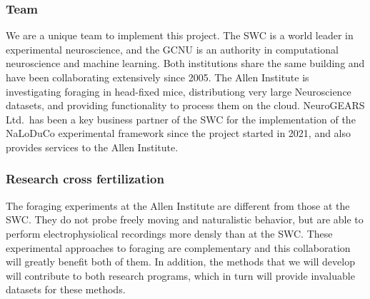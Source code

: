 \subsubsection{Team}

We are a unique team to implement this project.
%
The SWC is a world leader in experimental neuroscience, and the GCNU is an
authority in computational neuroscience and machine learning. Both institutions
share the same building and have been collaborating extensively since 2005.
%
The Allen Institute is investigating
foraging in head-fixed mice, distributiong very large Neuroscience datasets,
and providing functionality to process them on the cloud.
%
NeuroGEARS Ltd.\ has been a key business partner of the SWC for the
implementation of the NaLoDuCo experimental framework since the project started
in 2021, and also provides services to the Allen Institute.

\subsubsection{Research cross fertilization}

The foraging experiments at the Allen Institute are different from those at
the SWC. They do not probe freely moving and naturalistic behavior, but are
able to perform electrophysiolical recordings more densly than at the SWC.
%
These experimental approaches to foraging are complementary and this
collaboration will greatly benefit both of them.
%
In addition, the methods that we will develop will contribute to both research
programs, which in turn will provide invaluable datasets for these methods.

